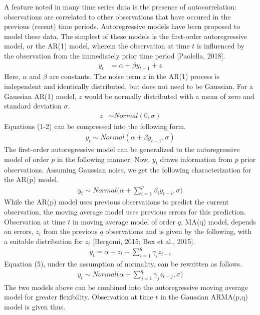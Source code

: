 \documentclass[12pt,letterpaper,reqno,fleqn]{article}
\begin{document}
A feature noted in many time series data is the presence of autocorrelation: observations are correlated to other observations that have occured in the previous (recent) time periods. Autoregressive models have been proposed to model these data. The simplest of these models is the first-order autoregressive model, or the AR(1) model, wherein the observation at time $t$ is influenced by the observation from the immediately prior time period [Paolella, 2018].
\begin{align}
y_t &= \alpha + \beta y_{t-1} + z 
\end{align}
Here, $\alpha$ and $\beta$ are constants. The noise term $z$ in the AR(1) process is independent and identically distributed, but does not need to be Gaussian. For a Gaussian AR(1) model, $z$ would be normally distributed with a mean of zero and standard deviation $\sigma$.
\begin{align}
z &\sim Normal(0, \sigma)
\end{align}
Equations (1-2) can be compressed into the following form.
\begin{align}
y_t \sim Normal(\alpha + \beta y_{t-1}, \sigma)
\end{align}
The first-order autoregressive model can be generalized to the autoregressive model of order $p$ in the following manner. Now, $y_t$ draws information from $p$ prior observations. Assuming Gaussian noise, we get the following characterization for the AR(p) model.
\begin{align}
y_t \sim Normal \big(\alpha + \sum_{i=1}^p \beta_i y_{t-i}, \sigma \big)
\end{align}
\hspace{.5cm} While the AR(p) model uses previous observations to predict the current observation, the moving average model uses previous errors for this prediction. Observation at time $t$ in moving average model of order $q$, MA(q) model, depends on errors, $z_i$ from the previous $q$ observations and is given by the following, with a suitable distribution for $z_t$ [Bergomi, 2015; Box et al., 2015].
\begin{align}
y_t = \alpha + z_t + \sum_{i=1}^q \gamma_i z_{t-i}
\end{align}
Equation (5), under the assumption of normality, can be rewritten as follows.
\begin{align}
y_t \sim Normal \big( \alpha + \sum_{j=1}^q \gamma_j z_{t-j}, \sigma \big)
\end{align}
\hspace{.5cm} The two models above can be combined into the autoregressive moving average model for greater flexibility. Observation at time $t$ in the Gaussian ARMA(p,q) model is given thus.
\end{document}
